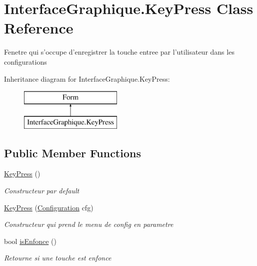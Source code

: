 \hypertarget{class_interface_graphique_1_1_key_press}{\section{Interface\-Graphique.\-Key\-Press Class Reference}
\label{class_interface_graphique_1_1_key_press}
}


Fenetre qui s'occupe d'enregistrer la touche entree par l'utilisateur dans les configurations  


Inheritance diagram for Interface\-Graphique.\-Key\-Press\-:\begin{figure}[H]
\begin{center}
\leavevmode
\includegraphics[height=2.000000cm]{class_interface_graphique_1_1_key_press}
\end{center}
\end{figure}
\subsection*{Public Member Functions}
\begin{DoxyCompactItemize}
\item 
\hyperlink{class_interface_graphique_1_1_key_press_ace2229d11f20b25086c1847b1e4f66aa}{Key\-Press} ()
\begin{DoxyCompactList}\small\item\em Constructeur par default \end{DoxyCompactList}\item 
\hyperlink{class_interface_graphique_1_1_key_press_af82c22bc2ae0e214364d0a440c02863c}{Key\-Press} (\hyperlink{class_interface_graphique_1_1_configuration}{Configuration} cfg)
\begin{DoxyCompactList}\small\item\em Constructeur qui prend le menu de config en parametre \end{DoxyCompactList}\item 
bool \hyperlink{class_interface_graphique_1_1_key_press_adab69f57d4bbd146942d0244b8388eee}{is\-Enfonce} ()
\begin{DoxyCompactList}\small\item\em Retourne si une touche est enfonce \end{DoxyCompactList}\end{DoxyCompactItemize}
